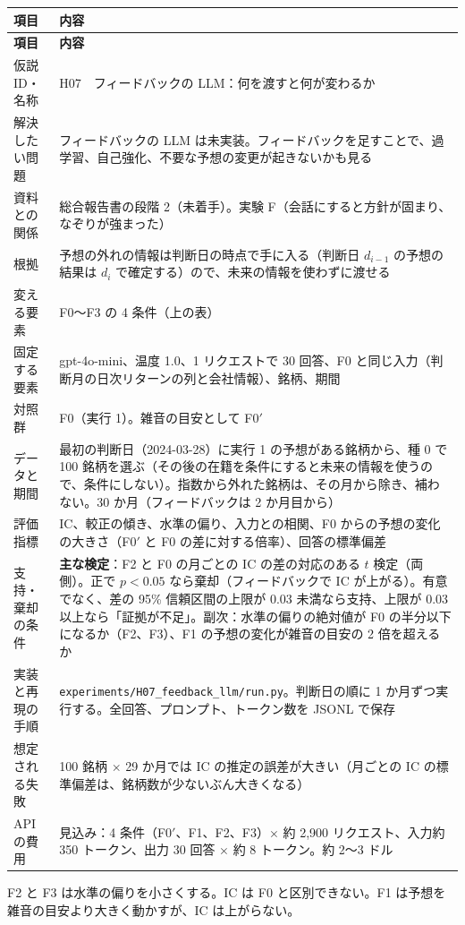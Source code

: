\documentclass[xelatex,ja=standard,jafont=haranoaji,a4paper,10pt,openany]{bxjsreport}
\newcommand{\code}[1]{\texttt{#1}}
\newenvironment{plan}{\small\begin{longtable}{p{3.3cm}p{11.6cm}}\toprule\textbf{項目} & \textbf{内容} \\\midrule\endfirsthead
\toprule\textbf{項目} & \textbf{内容} \\\midrule\endhead\bottomrule\endfoot}{\end{longtable}}
\begin{document}
\begin{plan}
仮説 ID・名称 & H07　フィードバックの LLM：何を渡すと何が変わるか \\
解決したい問題 & フィードバックの LLM は未実装。フィードバックを足すことで、過学習、自己強化、不要な予想の変更が起きないかも見る \\
資料との関係 & 総合報告書の段階 2（未着手）。実験 F（会話にすると方針が固まり、なぞりが強まった） \\
根拠 & 予想の外れの情報は判断日の時点で手に入る（判断日 $d_{i-1}$ の予想の結果は $d_i$ で確定する）ので、未来の情報を使わずに渡せる \\
変える要素 & F0〜F3 の 4 条件（上の表） \\
固定する要素 & gpt-4o-mini、温度 1.0、1 リクエストで 30 回答、F0 と同じ入力（判断月の日次リターンの列と会社情報）、銘柄、期間 \\
対照群 & F0（実行 1）。雑音の目安として F0$'$ \\
データと期間 & 最初の判断日（2024-03-28）に実行 1 の予想がある銘柄から、種 0 で 100 銘柄を選ぶ（その後の在籍を条件にすると未来の情報を使うので、条件にしない）。指数から外れた銘柄は、その月から除き、補わない。30 か月（フィードバックは 2 か月目から） \\
評価指標 & IC、較正の傾き、水準の偏り、入力との相関、F0 からの予想の変化の大きさ（F0$'$ と F0 の差に対する倍率）、回答の標準偏差 \\
支持・棄却の条件 & \textbf{主な検定}：F2 と F0 の月ごとの IC の差の対応のある $t$ 検定（両側）。正で $p<0.05$ なら棄却（フィードバックで IC が上がる）。有意でなく、差の 95\% 信頼区間の上限が 0.03 未満なら支持、上限が 0.03 以上なら「証拠が不足」。副次：水準の偏りの絶対値が F0 の半分以下になるか（F2、F3）、F1 の予想の変化が雑音の目安の 2 倍を超えるか \\
実装と再現の手順 & \code{experiments/H07\_feedback\_llm/run.py}。判断日の順に 1 か月ずつ実行する。全回答、プロンプト、トークン数を JSONL で保存 \\
想定される失敗 & 100 銘柄 $\times$ 29 か月では IC の推定の誤差が大きい（月ごとの IC の標準偏差は、銘柄数が少ないぶん大きくなる） \\
API の費用 & 見込み：4 条件（F0$'$、F1、F2、F3）$\times$ 約 2,900 リクエスト、入力約 350 トークン、出力 30 回答 $\times$ 約 8 トークン。約 2〜3 ドル \\
\end{plan}

\begin{predbox}
F2 と F3 は水準の偏りを小さくする。IC は F0 と区別できない。F1 は予想を雑音の目安より大きく動かすが、IC は上がらない。
\end{predbox}
\end{document}
